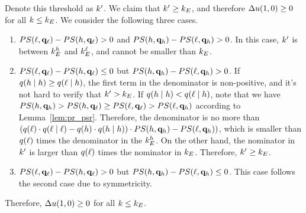 Denote this threshold as $k'$. We claim that $k' \ge k_E$, and therefore $\Delta u(1, 0) \ge 0$ for all $k \le k_E$. 
We consider the following three cases. 
\begin{enumerate}
    \item $PS(\ell, \mathbf{q}_\ell) - PS(h, \mathbf{q}_{\ell}) > 0$ and $PS(h, \mathbf{q}_h) - PS(\ell, \mathbf{q}_h) > 0$. In this case, $k'$ is between $k_E^h$ and $k_E^{\ell}$, and cannot be smaller than $k_E$. 
    \item  $PS(\ell, \mathbf{q}_\ell) - PS(h, \mathbf{q}_{\ell}) \le 0$ but $PS(h, \mathbf{q}_h) - PS(\ell, \mathbf{q}_h) > 0$. 
    If $q(h\mid h) \ge q(\ell \mid h)$, the first term in the denominator is non-positive, and it's not hard to verify that $k' > k_E$. If $q(h\mid h) < q(\ell \mid h)$, note that we have $PS(h, \mathbf{q}_h) > PS(h, \mathbf{q}_{\ell}) \ge PS(\ell, \mathbf{q}_\ell) > PS(\ell, \mathbf{q}_h)$ according to Lemma~\ref{lem:pr_psr}.
    Therefore, the denominator is no more than $(q(\ell)\cdot q(\ell \mid \ell) - q(h)\cdot q(h\mid h))\cdot PS(h, \mathbf{q}_h) - PS(\ell, \mathbf{q}_h))$, which is smaller than $q(\ell)$ times the denominator in the $k_E^h$. On the other hand, the nominator in $k'$ is larger than $q(\ell)$ times the nominator in $k_E$. Therefore, $k' \ge k_E$. 
    \item $PS(\ell, \mathbf{q}_\ell) - PS(h, \mathbf{q}_{\ell}) > 0$ but $PS(h, \mathbf{q}_h) - PS(\ell, \mathbf{q}_h) \le 0$. This case follows the second case due to symmetricity. 
\end{enumerate}
Therefore, $\Delta u(1, 0) \ge 0$ for all $k \le k_E$.


